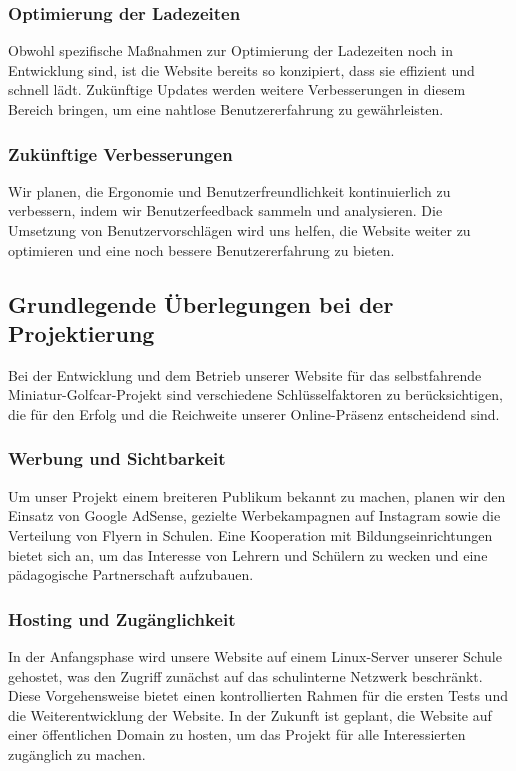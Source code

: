 \subsubsection{Optimierung der Ladezeiten}
Obwohl spezifische Maßnahmen zur Optimierung der Ladezeiten noch in Entwicklung sind, ist die Website bereits so konzipiert, dass sie effizient und schnell lädt. Zukünftige Updates werden weitere Verbesserungen in diesem Bereich bringen, um eine nahtlose Benutzererfahrung zu gewährleisten.

\subsubsection{Zukünftige Verbesserungen}
Wir planen, die Ergonomie und Benutzerfreundlichkeit kontinuierlich zu verbessern, indem wir Benutzerfeedback sammeln und analysieren. Die Umsetzung von Benutzervorschlägen wird uns helfen, die Website weiter zu optimieren und eine noch bessere Benutzererfahrung zu bieten.

\subsection{Grundlegende Überlegungen bei der Projektierung}

Bei der Entwicklung und dem Betrieb unserer Website für das selbstfahrende Miniatur-Golfcar-Projekt sind verschiedene Schlüsselfaktoren zu berücksichtigen, die für den Erfolg und die Reichweite unserer Online-Präsenz entscheidend sind.

\subsubsection{Werbung und Sichtbarkeit}

Um unser Projekt einem breiteren Publikum bekannt zu machen, planen wir den Einsatz von Google AdSense, gezielte Werbekampagnen auf Instagram sowie die Verteilung von Flyern in Schulen. Eine Kooperation mit Bildungseinrichtungen bietet sich an, um das Interesse von Lehrern und Schülern zu wecken und eine pädagogische Partnerschaft aufzubauen.

\subsubsection{Hosting und Zugänglichkeit}

In der Anfangsphase wird unsere Website auf einem Linux-Server unserer Schule gehostet, was den Zugriff zunächst auf das schulinterne Netzwerk beschränkt. Diese Vorgehensweise bietet einen kontrollierten Rahmen für die ersten Tests und die Weiterentwicklung der Website. In der Zukunft ist geplant, die Website auf einer öffentlichen Domain zu hosten, um das Projekt für alle Interessierten zugänglich zu machen.


